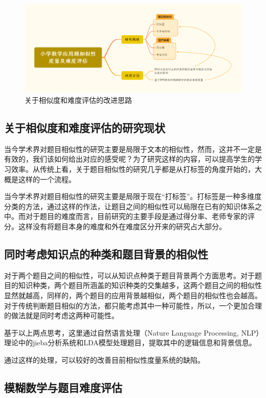 \begin{figure}[h]
    \centering
    \includegraphics[scale=0.22]{res/figure042227.png}
    \caption{关于相似度和难度评估的改进思路}
\end{figure}
 
\subsection{关于相似度和难度评估的研究现状}

当今学术界对题目相似性的研究主要是局限于文本的相似性，然而，这并不一定是有效的，我们该如何给出对应的感受呢？为了研究这样的内容，可以提高学生的学习效率。从传统上看，关于题目相似性的研究几乎都是从打标签的角度开始的\cite{xuTimunandupinggufangfayanjiuzongshu2022}，大概是这样的一个流程。

当今学术界对题目相似性的研究主要是局限于现在“打标签”。打标签是一种多维度分类的方法，通过这样的作法，让题目之间的相似性可以局限在已有的知识体系之中。而对于题目的难度而言，目前研究的主要手段是通过得分率、老师专家的评分。这样没有将题目本身的难度和外在难度区分开来的研究占大部分。

\subsection{同时考虑知识点的种类和题目背景的相似性}

对于两个题目之间的相似性，可以从知识点种类于题目背景两个方面思考。对于题目的知识种类，两个题目所涵盖的知识种类的交集越多，这两个题目之间的相似性显然就越高，同样的，两个题目的应用背景越相似，两个题目的相似性也会越高。对于传统判断题目相似的方法，都只能考虑其中一种可能性，所以，一个更加合理的做法就是同时考虑这两种可能性。

基于以上两点思考，这里通过自然语言处理（Nature Language Processing, NLP）理论中的jieba分析系统和LDA模型处理题目，提取其中的逻辑信息和背景信息。

通过这样的处理，可以较好的改善目前相似性度量系统的缺陷。

\subsection{模糊数学与题目难度评估}

